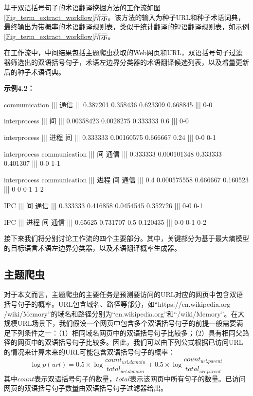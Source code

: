 基于双语括号句子的术语翻译挖掘方法的工作流如图\ref{Fig_term_extract_workflow}所示。该方法的输入为种子URL和种子术语词典，最终输出为带概率的术语翻译规则表，类似于统计翻译的短语翻译规则表，如示例\ref{Fig_term_extract_workflow}所示。

在工作流中，中间结果包括主题爬虫获取的Web网页和URL，双语括号句子过滤器筛选出的双语括号句子，术语左边界分类器的术语翻译候选列表，以及增量更新后的种子术语词典。

\begin{center}
	\begin{boxedminipage}[h]{0.9\linewidth}
		\small
		\textbf{示例4.2：}
		
		communication ||| 通信 ||| 0.387201 0.358436 0.623309 0.668845 ||| 0-0
		
		interprocess ||| 间 ||| 0.00358423 0.0028275 0.333333 0.6 ||| 0-0
		
		interprocess ||| 进程 间 ||| 0.333333 0.00160575 0.666667 0.24 ||| 0-0 0-1
		
		interprocess communication ||| 间 通信 ||| 0.333333 0.000101348 0.333333 0.401307 ||| 0-0 1-1
		
		interprocess communication ||| 进程 间 通信 ||| 0.4 0.000575558 0.666667 0.160523 ||| 0-0 0-1 1-2
		
		IPC ||| 间 通信 ||| 0.333333 0.416858 0.0454545 0.352726 ||| 0-0 0-1
		
		IPC ||| 进程 间 通信 ||| 0.65625 0.731707 0.5 0.120435 ||| 0-0 0-1 0-2
	\end{boxedminipage}
\end{center}

接下来我们将分别讨论工作流的四个主要部分。其中，关键部分为基于最大熵模型的目标语言术语左边界分类器，以及术语翻译概率生成器。

\subsection{主题爬虫}

对于本文而言，主题爬虫的主要任务是预测要访问的URL对应的网页中包含双语括号句子的概率。URL包含域名、路径等部分，如“https://en.wikipedia.org /wiki/Memory”的域名和路径分别为“en.wikipedia.org”和“/wiki/Memory”。在大规模URL场景下，我们假设一个网页中包含多个双语括号句子的前提一般需要满足下列条件之一：（1）相同域名网页中的双语括号句子比较多；（2）具有相同父路径的网页中的双语括号句子比较多。因此，我们可以由下列公式根据已访问URL的情况来计算未来的URL可能包含双语括号句子的概率：
\begin{equation}
\log p(url) =0.5\times \log \frac{count_{url.domain}}{total_{url.domain}}+ 0.5\times \log \frac{count_{url.parent}}{total_{url.parent}}
\end{equation}
其中$count$表示双语括号句子的数量，$total$表示该网页中所有句子的数量。已访问网页的双语括号句子数量由双语括号句子过滤器给出。

